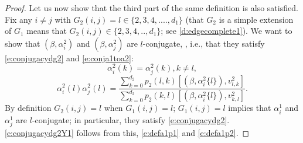 \documentclass[11pt,a4paper]{article}
\begin{document}
\begin{proof}
Let us now show that the third part of the same definition is also satisfied.
Fix any $i\neq j$ with $G_2(i,j) =l \in \{2,3,4,....,d_1\}$
(that $G_2$ is a simple extension of $G_1$ means that
$G_2(i,j) \in \{2,3,4,..,d_1\}$; see \eqref{d:edgecomplete1}).
We want to show that $(\beta,\alpha_{i}^2)$ and
$(\beta,\alpha_{j}^2)$ are $l$-conjugate,
, i.e., that they satisfy
\eqref{e:conjugacydg2} and \eqref{e:conja1toa2}:
\begin{equation}\label{e:conjugacydg2Y1}
\alpha_{i}^2(k) = \alpha_j^2(k), k \neq l,
\end{equation}
\begin{equation}\label{e:conja1toa2Y1}
\alpha_{i}^2(l) \alpha_j^2(l)
=\frac{\sum_{k=0}^{d_2} p_2(l,k) [(\beta,\alpha_i^2\{l\}),v_{l,k}^2]} 
{\sum_{k=0}^{d_2} p_2(k,l) [(\beta, \alpha_i^2\{l\}), v_{k,l}^2]}.
\end{equation}
By definition
$G_2(i,j)=l$
when $G_1(i,j) =l$; $G_1(i,j)=l$ implies that
$\alpha_i^1$ and $\alpha_j^1$ are $l$-conjugate;  in particular,
they satisfy \eqref{e:conjugacydg2}.
\eqref{e:conjugacydg2Y1} 
follows from this, \eqref{e:defa1p1} and \eqref{e:defa1p2}.


\end{proof}
\end{document}
